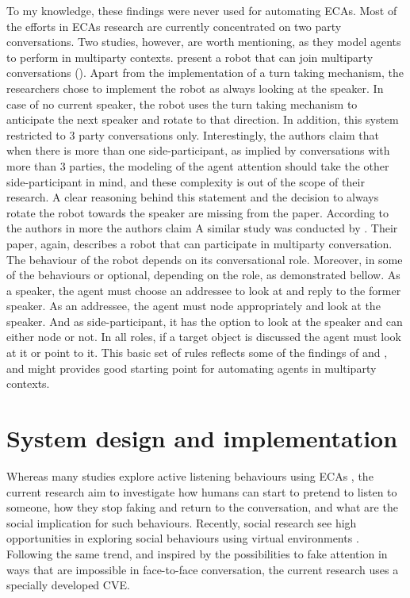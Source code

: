\documentclass[]{simple-thesis}
\begin{document}
To my knowledge, these findings were never used for automating ECAs.
Most of the efforts in ECAs research are currently concentrated on two party conversations.
Two studies, however, are worth mentioning, as they model agents to perform in multiparty contexts.
\citeauthor{Matsusaka2001} present a robot that can join multiparty conversations (\citeyear{Matsusaka2001}).
Apart from the implementation of a turn taking mechanism, the researchers chose to implement the robot as always looking at the speaker.
In case of no current speaker, the robot uses the turn taking mechanism to anticipate the next speaker and rotate to that direction.
In addition, this system restricted to 3 party conversations only.
Interestingly, the authors claim that when there is more than one side-participant, as implied by conversations with more than 3 parties, the modeling of the agent attention should take the other side-participant in mind, and these complexity is out of the scope of their research.
A clear reasoning behind this statement and the decision to always rotate the robot towards the speaker are missing from the paper.
According to the authors in more the authors claim
A similar study was conducted by \cite{Fujie2009}.
Their paper, again, describes a robot that can participate in multiparty conversation.
The behaviour of the robot depends on its conversational role.
Moreover, in some of the behaviours or optional, depending on the role, as demonstrated bellow.
As a speaker, the agent must choose an addressee to look at and reply to the former speaker.
As an addressee, the agent must node appropriately and look at the speaker.
And as side-participant, it has the option to look at the speaker and can either node or not.
In all roles, if a target object is discussed the agent must look at it or point to it.
This basic set of rules reflects some of the findings of \cite{Healey2009} and \cite{Battersby2010}, and might provides good starting point for automating agents in multiparty contexts.


\chapter{System design and implementation}\label{system_design_and_implementation}

Whereas many studies explore active listening behaviours using ECAs \citep{Nishimura2007, Bevacqua2008, Gratch2007, Huang2011, Lee2006, Poppe2013}, the current research aim to investigate how humans can start to pretend to listen to someone, how they stop faking and return to the conversation, and what are the social implication for such behaviours.
Recently, social research see high opportunities in exploring social behaviours using virtual environments \citep{Loomis1999}.
Following the same trend, and inspired by the possibilities to fake attention in ways that are impossible in face-to-face conversation, the current research uses a specially developed CVE.
\end{document}
